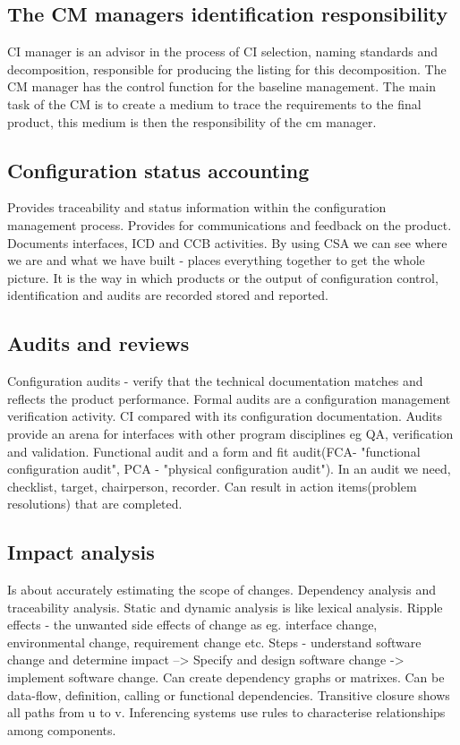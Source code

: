 \documentclass{article}
\begin{document}
\subsection{The CM managers identification responsibility}
CI manager is an advisor in the process of CI selection, naming standards  and decomposition, responsible for producing the listing for this decomposition. The CM manager has the control
function for the baseline management. The main task of the CM is to create a medium to trace the requirements to the final product, this medium is then the responsibility of the cm manager.

\subsection{ Configuration status accounting}
Provides traceability and status information within the configuration management process. Provides for communications and feedback on the product. Documents interfaces, ICD and CCB activities.
By using CSA we can see where we are and what we have built - places everything together to get the whole picture. It is the way in which products or the output of configuration control, identification and audits
are recorded stored and reported.
\subsection{Audits and reviews}
Configuration audits - verify that the technical documentation matches and reflects the product performance.
Formal audits are a configuration management verification activity. CI compared with its configuration documentation.
Audits provide an arena for interfaces with other program disciplines eg QA, verification and validation.
Functional audit and a form and fit audit(FCA- "functional configuration audit", PCA - "physical configuration audit").
In an audit we need, checklist, target, chairperson, recorder. Can result in action items(problem resolutions) that are completed.

\subsection{Impact analysis}
Is about accurately estimating the scope of changes. Dependency analysis and traceability analysis. Static and dynamic analysis is like lexical analysis.
Ripple effects - the unwanted side effects of change as eg. interface change, environmental change, requirement change etc.
Steps - understand software change and determine impact --> Specify and design software change -> implement software change.
Can create dependency graphs or matrixes. Can be data-flow, definition, calling or functional dependencies.
Transitive closure shows all paths from u to v. Inferencing systems use rules to characterise relationships among components.
\end{document}
